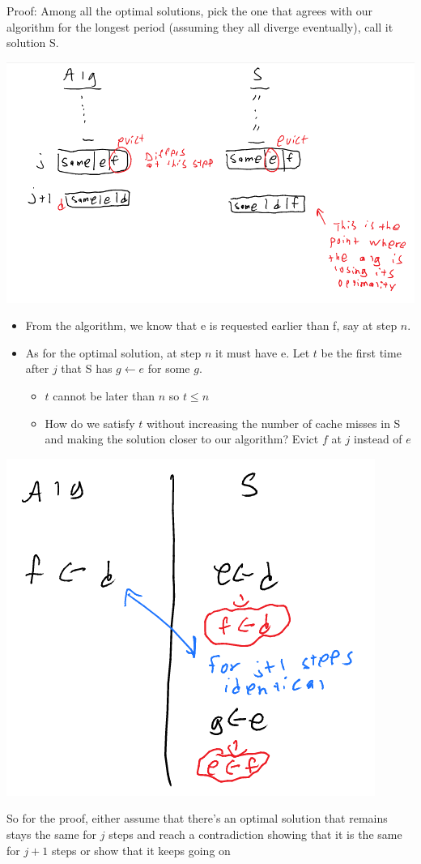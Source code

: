 \documentclass[11pt]{article}
\begin{document}
Proof: Among all the optimal solutions, pick the one that agrees with our algorithm for the longest period (assuming they all diverge eventually), call it solution S.
\begin{center}
\includegraphics[width=.9\linewidth]{./Images/i35.png}
\end{center}
\begin{itemize}
\item From the algorithm, we know that e is requested earlier than f, say at step \(n\).
\item As for the optimal solution, at step \(n\) it must have e. Let \(t\) be the first time after \(j\) that S has \(g \gets e\) for some \(g\).
\begin{itemize}
\item \(t\) cannot be later than \(n\) so \(t \leq n\)
\item How do we satisfy \(t\) without increasing the number of cache misses in S and making the solution closer to our algorithm? Evict \(f\) at \(j\) instead of \(e\)
\end{itemize}
\end{itemize}
\begin{center}
\includegraphics[width=.9\linewidth]{./Images/i36.png}
\end{center}
So for the proof, either assume that there's an optimal solution that remains stays the same for \(j\) steps and reach a contradiction showing that it is the same for \(j+1\) steps or show that it keeps going on
\end{document}
